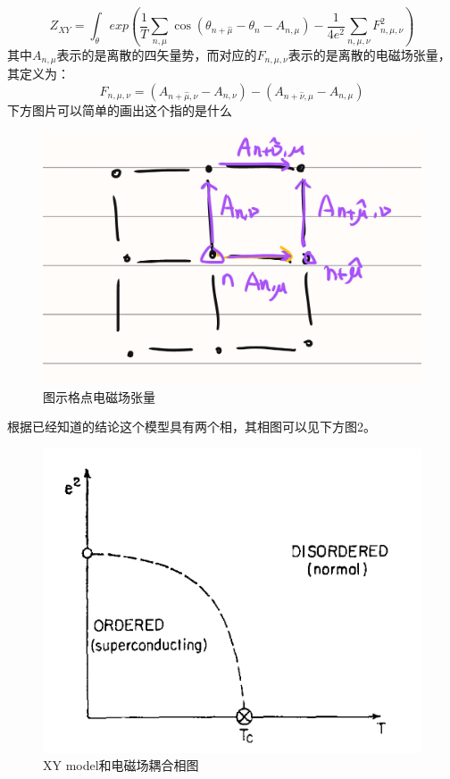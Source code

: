 \documentclass{article}
\begin{document}
\begin{equation}
    Z_{XY} = \int_{\theta}  exp{ ( \frac{1}{T}  \sum_{n,\mu} \cos(\theta_{n+ \hat \mu} - \theta_n - A_{n,\mu})  - \frac{1}{4e^2} \sum_{n,\mu,\nu} F_{n,\mu,\nu}^2 )}
\end{equation}
其中$A_{n,\mu}$表示的是离散的四矢量势，而对应的$F_{n,\mu,\nu}$表示的是离散的电磁场张量，其定义为：
\begin{equation}
    F_{n,\mu,\nu} = (A_{n+\hat \mu,\nu}- A_{n,\nu}) - (A_{n+\hat \nu , \mu} - A_{n, \mu})
\end{equation}
下方图片可以简单的画出这个指的是什么
\begin{figure}[htbp]
    \centering
    \includegraphics[scale=0.2]{1.jpg}
    \caption[short]{图示格点电磁场张量}
    \label{figure}
\end{figure}

根据已经知道的结论这个模型具有两个相，其相图可以见下方图2。

\begin{figure}[h]
    \centering
    \includegraphics[scale=0.7]{2.png}
    \caption[short]{XY model和电磁场耦合相图}
    \label{figure}
\end{figure}
\end{document}
